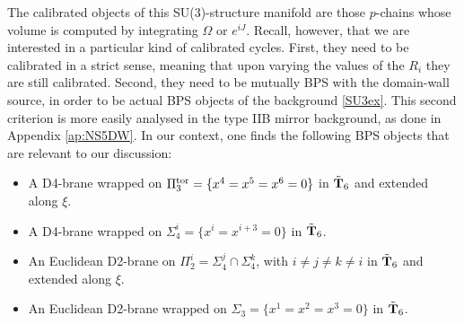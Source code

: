 \documentclass[11pt]{article}
\begin{document}
The calibrated objects of this SU(3)-structure manifold are those $p$-chains whose volume is computed by integrating $\Omega$ or $e^{iJ}$. Recall, however, that we are interested in a particular kind of calibrated cycles. First, they need to be calibrated in a strict sense, meaning that upon varying the values of the $R_i$ they are still calibrated. Second, they need to be mutually BPS with the domain-wall source, in order to be actual BPS objects of the background \eqref{SU3ex}. This second criterion is more easily analysed in the type IIB mirror background, as done in Appendix \ref{ap:NS5DW}. In our context, one finds the following BPS objects that are relevant to our discussion:

\begin{itemize}

\item[-] A D4-brane wrapped on $\Pi_3^{\rm tor} = \{ x^4=x^5=x^6=0\}$ in $\tilde{\bf T}_6$ and extended along $\xi$.  

\item[-] A D4-brane wrapped on $\Sigma_4^i = \{ x^i = x^{i+3} = 0\}$ in $\tilde{\bf T}_6$.

\item[-] An Euclidean D2-brane on $\Pi_2^i = \Sigma_4^j \cap \Sigma_4^k$, with $i \neq j \neq k \neq i$ in $\tilde{\bf T}_6$ and extended along $\xi$.

\item[-] An Euclidean D2-brane wrapped on $\Sigma_3 = \{ x^1=x^2=x^3=0\}$ in $\tilde{\bf T}_6$.

\end{itemize}
\end{document}

